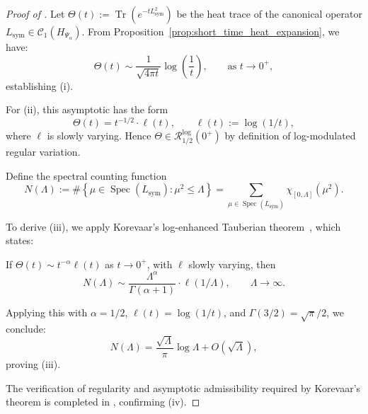 \begin{proof}[Proof of ]
Let \( \Theta(t) := \operatorname{Tr}(e^{-t L_{\mathrm{sym}}^2}) \) be the heat trace of the canonical operator \( L_{\mathrm{sym}} \in \mathcal{C}_1(H_{\Psi_\alpha}) \). From Proposition~\ref{prop:short_time_heat_expansion}, we have:
\[
\Theta(t) \sim \frac{1}{\sqrt{4\pi t}} \log\left( \frac{1}{t} \right), \qquad \text{as } t \to 0^+,
\]
establishing (i).

\medskip

For (ii), this asymptotic has the form
\[
\Theta(t) = t^{-1/2} \cdot \ell(t), \qquad \ell(t) := \log(1/t),
\]
where \( \ell \) is slowly varying. Hence \( \Theta \in \mathcal{R}^{\log}_{1/2}(0^+) \) by definition of log-modulated regular variation.

\medskip

Define the spectral counting function
\[
N(\Lambda) := \#\left\{ \mu \in \operatorname{Spec}(L_{\mathrm{sym}}) : \mu^2 \le \Lambda \right\}
= \sum_{\mu \in \operatorname{Spec}(L_{\mathrm{sym}})} \chi_{[0, \Lambda]}(\mu^2).
\]

\medskip

To derive (iii), we apply Korevaar’s log-enhanced Tauberian theorem~\cite[Ch.~III, Thm. 5.1]{Korevaar2004Tauberian}, which states:

If \( \Theta(t) \sim t^{-\alpha} \ell(t) \) as \( t \to 0^+ \), with \( \ell \) slowly varying, then
\[
N(\Lambda) \sim \frac{\Lambda^\alpha}{\Gamma(\alpha + 1)} \cdot \ell(1/\Lambda), \qquad \Lambda \to \infty.
\]

\medskip

Applying this with \( \alpha = 1/2 \), \( \ell(t) = \log(1/t) \), and \( \Gamma(3/2) = \sqrt{\pi}/2 \), we conclude:
\[
N(\Lambda) = \frac{\sqrt{\Lambda}}{\pi} \log \Lambda + O(\sqrt{\Lambda}),
\]
proving (iii).

\medskip

The verification of regularity and asymptotic admissibility required by Korevaar’s theorem is completed in , confirming (iv).
\end{proof}
